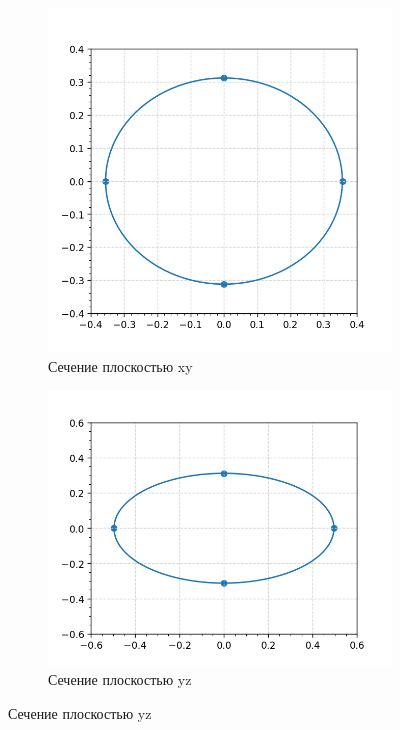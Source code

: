 \documentclass[a4paper,12pt]{article}
\begin{document}
\begin{itemize}
\begin{figure}[h!!]
\begin{subfigure}{0.33\textwidth}
                \includegraphics[width=\linewidth, height=\linewidth]{par_xy.png}
                \caption*{Сечение плоскостью xy}
                \label{fig:subim2}
            \end{subfigure}
            \begin{subfigure}{0.33\textwidth}
                \includegraphics[width=\linewidth, height=\linewidth]{par_yz.png}
                \caption*{Сечение плоскостью yz}
                \label{fig:subim3}
            \end{subfigure}


\end{figure}
\end{itemize}
\end{document}
